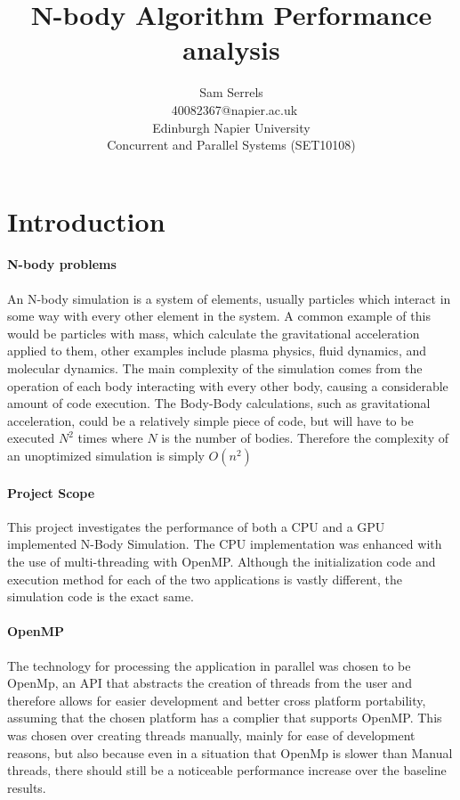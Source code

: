 \documentclass[conference]{acmsiggraph}
\title{N-body Algorithm Performance analysis}
\author{Sam Serrels\\\ 40082367@napier.ac.uk \\
Edinburgh Napier University\\
Concurrent and Parallel Systems (SET10108)}
\begin{document}
\maketitle

\section{Introduction}

\paragraph{N-body problems}
An N-body simulation is a system of elements, usually particles which interact in some way with every other element in the system. A common example of this would be particles with mass, which calculate the gravitational acceleration applied to them, other examples include plasma physics, fluid dynamics,
and molecular dynamics.
The main complexity of the simulation comes from the operation of each body interacting with every other body, causing a considerable amount of code execution. The Body-Body calculations, such as gravitational acceleration, could be a relatively simple piece of code, but will have to be executed $N^2$ times where $N$ is the number of bodies. Therefore the complexity of an unoptimized simulation is simply $O(n^2)$

\paragraph{Project Scope}
This project investigates the performance of both a CPU and a GPU implemented N-Body Simulation. The CPU implementation was enhanced with the use of multi-threading with OpenMP. Although the initialization code and execution method for each of the two applications is vastly different, the simulation code is the exact same.

\paragraph{OpenMP}
The technology for processing the application in parallel was chosen to be OpenMp, an API that abstracts the creation of threads from the user and therefore allows for easier development and better cross platform portability, assuming that the chosen platform has a complier that supports OpenMP.
This was chosen over creating threads manually, mainly for ease of development reasons, but also because even in a situation that OpenMp is slower than Manual threads, there should still be a noticeable performance increase over the baseline results.
\end{document}
